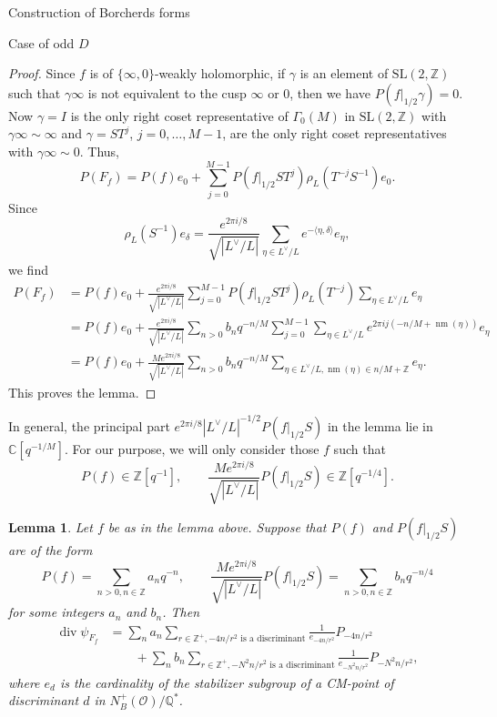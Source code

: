 \documentclass{amsart}
\newcounter{lemma}
\newtheorem{Lemma}[lemma]{Lemma}
\theoremstyle{definition}
\def\nm{\operatorname{nm}}
\def\C{\mathbb C}
\def\O{\mathcal O}
\def\Q{\mathbb Q}
\def\Z{\mathbb Z}
\def\gen#1{\langle #1\rangle}
\def\SL{\mathrm{SL}}
\def\div{\operatorname{div}}
\begin{document}
\begin{section}{Construction of Borcherds forms}
\begin{subsection}{Case of odd $D$}
\begin{proof} Since $f$ is of $\{\infty,0\}$-weakly holomorphic, if
  $\gamma$ is an element of $\SL(2,\Z)$ such that $\gamma\infty$ is
  not equivalent to the cusp $\infty$ or $0$, then we have
  $P(f|_{1/2}\gamma)=0$. Now $\gamma=I$ is the only right coset
  representative of $\Gamma_0(M)$ in $\SL(2,\Z)$ with
  $\gamma\infty\sim\infty$ and $\gamma=ST^j$, $j=0,\ldots,M-1$, are the
  only right coset representatives with $\gamma\infty\sim 0$. Thus,
  $$
    P(F_f)=P(f)e_0
   +\sum_{j=0}^{M-1}P(f\big|_{1/2}ST^j)\rho_L(T^{-j}S^{-1})e_0.
  $$
  Since
  $$
    \rho_L(S^{-1})e_\delta=\frac{e^{2\pi i/8}}{\sqrt{|L^\vee/L|}}
    \sum_{\eta\in L^\vee/L}e^{-\gen{\eta,\delta}}e_\eta,
  $$
  we find
  \begin{equation*}
  \begin{split}
    P(F_f)&=P(f)e_0+\frac{e^{2\pi i/8}}{\sqrt{|L^\vee/L|}}
    \sum_{j=0}^{M-1}P(f\big|_{1/2}ST^j)\rho_L(T^{-j})
    \sum_{\eta\in L^\vee/L}e_\eta \\
  &=P(f)e_0+\frac{e^{2\pi i/8}}{\sqrt{|L^\vee/L|}}
    \sum_{n>0}b_nq^{-n/M}\sum_{j=0}^{M-1}\sum_{\eta\in L^\vee/L}
    e^{2\pi ij(-n/M+\nm(\eta))}e_\eta \\
  &=P(f)e_0+\frac{Me^{2\pi i/8}}{\sqrt{|L^\vee/L|}}
    \sum_{n>0}b_nq^{-n/M}\sum_{\eta\in L^\vee/L,\nm(\eta)\in n/M+\Z}e_\eta.
  \end{split}
  \end{equation*}
  This proves the lemma.
\end{proof}

In general, the principal part
$e^{2\pi i/8}|L^\vee/L|^{-1/2}P(f|_{1/2}S)$ in the 
lemma lie in $\C[q^{-1/M}]$. For our purpose, we will only
consider those $f$ such that
$$
  P(f)\in\Z[q^{-1}], \qquad
  \frac{Me^{2\pi i/8}}{\sqrt{|L^\vee/L|}}P(f|_{1/2}S)
  \in\Z[q^{-1/4}].
$$

\begin{Lemma}\label{lemma: divisor infinity 0} Let $f$ be as in the
  lemma above. Suppose that $P(f)$ and $P(f|_{1/2}S)$ are of the form
  $$
    P(f)=\sum_{n>0,n\in\Z}a_nq^{-n}, \qquad
    \frac{Me^{2\pi i/8}}{\sqrt{|L^\vee/L|}}P(f|_{1/2}S)
   =\sum_{n>0,n\in\Z}b_nq^{-n/4}
  $$
  for some integers $a_n$ and $b_n$. Then
  \begin{equation*}
  \begin{split}
    \div\psi_{F_f}&=\sum_na_n\sum_{r\in\Z^+,-4n/r^2\text{ is a discriminant}}
    \frac1{e_{-4n/r^2}}P_{-4n/r^2} \\
  &\qquad+\sum_nb_n\sum_{r\in\Z^+,-N^2n/r^2\text{ is a discriminant}}
    \frac1{e_{-N^2n/r^2}}P_{-N^2n/r^2},
  \end{split}
  \end{equation*}
  where $e_d$ is the cardinality of the
  stabilizer subgroup of a CM-point of discriminant $d$ in $N_B^+(\O)/\Q^*$.
\end{Lemma}


\end{subsection}
\end{section}
\end{document}
